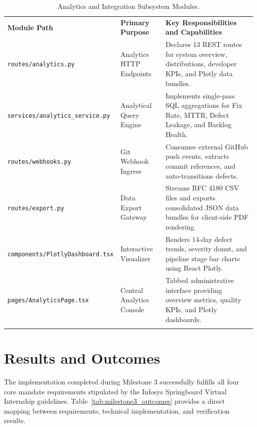 \documentclass[11pt,a4paper]{article}
\providecommand{\toprule}{\noalign{\hrule height 1.2pt}}
\providecommand{\midrule}{\noalign{\hrule height 0.6pt}}
\providecommand{\bottomrule}{\noalign{\hrule height 1.2pt}}
\providecommand{\addlinespace}{\vspace{4pt}}
\begin{document}
\begin{table}[htbp]
\centering
\small
\caption{Analytics and Integration Subsystem Modules.}
\label{tab:analytics_modules}
\begin{tabularx}{\textwidth}{lp{4cm}X}
\toprule
\textbf{Module Path} & \textbf{Primary Purpose} & \textbf{Key Responsibilities and Capabilities} \\
\midrule
\texttt{routes/analytics.py} & Analytics HTTP Endpoints & Declares 13 REST routes for system overview, distributions, developer KPIs, and Plotly data bundles. \\
\addlinespace
\texttt{services/analytics\_service.py} & Analytical Query Engine & Implements single-pass SQL aggregations for Fix Rate, MTTR, Defect Leakage, and Backlog Health. \\
\addlinespace
\texttt{routes/webhooks.py} & Git Webhook Ingress & Consumes external GitHub push events, extracts commit references, and auto-transitions defects. \\
\addlinespace
\texttt{routes/export.py} & Data Export Gateway & Streams RFC 4180 CSV files and exports consolidated JSON data bundles for client-side PDF rendering. \\
\addlinespace
\texttt{components/PlotlyDashboard.tsx} & Interactive Visualizer & Renders 14-day defect trends, severity donut, and pipeline stage bar charts using React Plotly. \\
\addlinespace
\texttt{pages/AnalyticsPage.tsx} & Central Analytics Console & Tabbed administrative interface providing overview metrics, quality KPIs, and Plotly dashboards. \\
\bottomrule
\end{tabularx}
\end{table}

\section{Results and Outcomes}
The implementation completed during Milestone 3 successfully fulfills all four core mandate requirements stipulated by the Infosys Springboard Virtual Internship guidelines. Table~\ref{tab:milestone3_outcomes} provides a direct mapping between requirements, technical implementation, and verification results.
\end{document}
